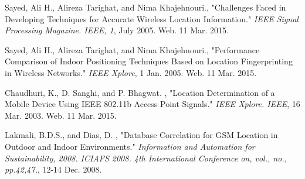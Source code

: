 \documentclass[twoside]{article}
\begin{document}
\begin{multicols}{2}









\begin{thebibliography}{99} %

 Sayed, Ali H., Alireza Tarighat, and Nima Khajehnouri.,
"Challenges Faced in Developing Techniques for Accurate Wireless Location Information."
\emph{IEEE Signal Processing Magazine. IEEE, 1}, July 2005. Web. 11 Mar. 2015.
 
 Sayed, Ali H., Alireza Tarighat, and Nima Khajehnouri.,
"Performance Comparison of Indoor Positioning Techniques Based on Location Fingerprinting in Wireless Networks."
\emph{IEEE Xplore}, 1 Jan. 2005. Web. 11 Mar. 2015. 
 
 Chaudhuri, K., D. Sanghi, and P. Bhagwat. ,
"Location Determination of a Mobile Device Using IEEE 802.11b Access Point Signals."
\emph{IEEE Xplore. IEEE}, 16 Mar. 2003. Web. 11 Mar. 2015.

 Lakmali, B.D.S., and Dias, D. ,
"Database Correlation for GSM Location in Outdoor and Indoor Environments."
\emph{Information and Automation for Sustainability, 2008. ICIAFS 2008. 4th International Conference on, vol., no., pp.42,47,}, 12-14 Dec. 2008.
 

\end{thebibliography}
\end{multicols}
\end{document}
